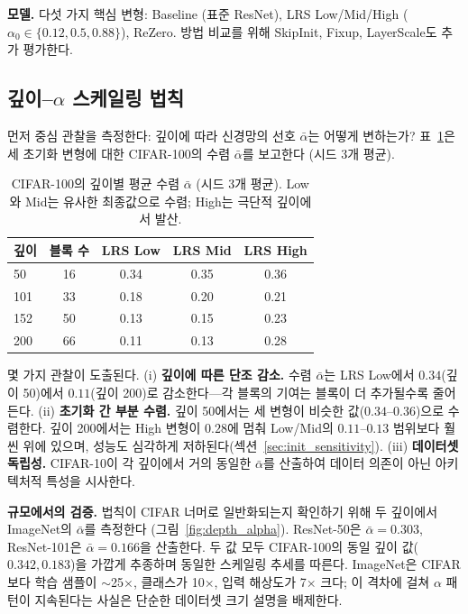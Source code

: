 \documentclass{bmvc2k}
\begin{document}
\textbf{모델.} 다섯 가지 핵심 변형: Baseline (표준 ResNet), LRS Low/Mid/High ($\alpha_0 \in \{0.12, 0.5, 0.88\}$), ReZero. 방법 비교를 위해 SkipInit, Fixup, LayerScale도 추가 평가한다.

\subsection{깊이--$\alpha$ 스케일링 법칙}
\label{sec:alpha_convergence}

먼저 중심 관찰을 측정한다: 깊이에 따라 신경망의 선호 $\bar{\alpha}$는 어떻게 변하는가? 표~\ref{tab:depth_alpha}은 세 초기화 변형에 대한 CIFAR-100의 수렴 $\bar{\alpha}$를 보고한다 (시드 3개 평균).

\begin{table}[!ht]
\centering
\small
\caption{CIFAR-100의 깊이별 평균 수렴 $\bar{\alpha}$ (시드 3개 평균). Low와 Mid는 유사한 최종값으로 수렴; High는 극단적 깊이에서 발산.}
\label{tab:depth_alpha}
\begin{tabular}{lcccc}
\toprule
\textbf{깊이} & \textbf{블록 수} & \textbf{LRS Low} & \textbf{LRS Mid} & \textbf{LRS High} \\
\midrule
50  & 16 & 0.34 & 0.35 & 0.36 \\
101 & 33 & 0.18 & 0.20 & 0.21 \\
152 & 50 & 0.13 & 0.15 & 0.23 \\
200 & 66 & 0.11 & 0.13 & 0.28 \\
\bottomrule
\end{tabular}
\end{table}

몇 가지 관찰이 도출된다. (i) \textbf{깊이에 따른 단조 감소.} 수렴 $\bar{\alpha}$는 LRS Low에서 $0.34$(깊이 50)에서 $0.11$(깊이 200)로 감소한다---각 블록의 기여는 블록이 더 추가될수록 줄어든다. (ii) \textbf{초기화 간 부분 수렴.} 깊이 50에서는 세 변형이 비슷한 값($0.34$--$0.36$)으로 수렴한다. 깊이 200에서는 High 변형이 $0.28$에 멈춰 Low/Mid의 $0.11$--$0.13$ 범위보다 훨씬 위에 있으며, 성능도 심각하게 저하된다(섹션~\ref{sec:init_sensitivity}). (iii) \textbf{데이터셋 독립성.} CIFAR-10이 각 깊이에서 거의 동일한 $\bar{\alpha}$를 산출하여 데이터 의존이 아닌 아키텍처적 특성을 시사한다.

\textbf{규모에서의 검증.} 법칙이 CIFAR 너머로 일반화되는지 확인하기 위해 두 깊이에서 ImageNet의 $\bar{\alpha}$를 측정한다 (그림~\ref{fig:depth_alpha}). ResNet-50은 $\bar{\alpha} = 0.303$, ResNet-101은 $\bar{\alpha} = 0.166$을 산출한다. 두 값 모두 CIFAR-100의 동일 깊이 값($0.342, 0.183$)을 가깝게 추종하며 동일한 스케일링 추세를 따른다. ImageNet은 CIFAR보다 학습 샘플이 $\sim$25$\times$, 클래스가 10$\times$, 입력 해상도가 7$\times$ 크다; 이 격차에 걸쳐 $\alpha$ 패턴이 지속된다는 사실은 단순한 데이터셋 크기 설명을 배제한다.
\end{document}
